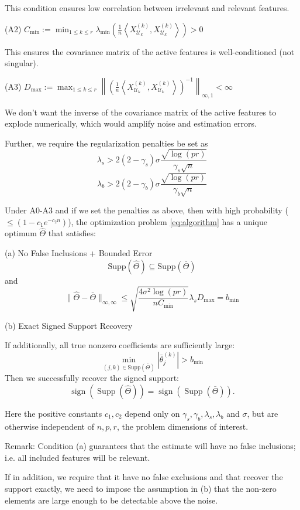 \documentclass{article}
\begin{document}
This condition ensures low correlation between irrelevant and relevant features.

(A2)
$C_{\min} := \min_{1 \le k \le r} \lambda_{\min} \left( \frac{1}{n}\left< X^{(k)}_{\mathcal{U}_k}, X^{(k)}_{\mathcal{U}_k} \right>\right) > 0$

This ensures the covariance matrix of the active features is well-conditioned (not singular).

(A3)
$D_{\max} := \max_{1 \le k \le r}
\left\|\left( \frac{1}{n} \left< X^{(k)}_{\mathcal{U}_k}, X^{(k)}_{\mathcal{U}_k}\right> \right)^{-1} \right\|_{\infty, 1}
< \infty$

We don’t want the inverse of the covariance matrix of the active features to explode numerically, which would amplify noise and estimation errors.

Further, we require the regularization penalties be set as
$$\lambda_s > 2(2 - \gamma_s)\sigma \frac{\sqrt{\log(pr)}}{\gamma_s \sqrt{n}}$$
$$\lambda_b > 2(2 - \gamma_b)\sigma \frac{\sqrt{\log(pr)}}{\gamma_b \sqrt{n}}$$

Under A0-A3 and if we set the penalties as above, then with high probability ($\le (1 - c_1 e^{-c_2 n})$), the optimization problem \eqref{eq:algorithm} has a unique optimum $\widehat{\Theta}$ that satisfies:

(a) No False Inclusions + Bounded Error
$$\text{Supp}(\widehat{\Theta}) \subseteq \text{Supp}(\bar{\Theta})$$
and
\begin{equation*}
\|\widehat{\Theta} - \bar{\Theta}\|_{\infty, \infty}
\le
\sqrt{\frac{4\sigma^2 \log(p r)}{n C_{\min}}}\lambda_s D_{\max} =  b_{\min}
\end{equation*}

(b) Exact Signed Support Recovery

If additionally, all true nonzero coefficients are sufficiently large:
$$\min_{(j,k) \in \text{Supp}(\bar{\Theta})} |\bar{\theta}^{(k)}_j| > b_{\min}$$
Then we successfully recover the signed support:
$$\operatorname{sign}(\operatorname{Supp}(\hat{\Theta})) = \operatorname{sign}(\operatorname{Supp}(\bar{\Theta})).$$

Here the positive constants $c_1, c_2$ depend only on $\gamma_s, \gamma_b, \lambda_s, \lambda_b$ and $\sigma$, but are otherwise independent of $n, p, r$, the problem dimensions of interest.

Remark: Condition (a) guarantees that the estimate will have no false inclusions; i.e. all included features will be relevant.

If in addition, we require that it have no false exclusions and that recover the support exactly, we need to impose the assumption in (b) that the non-zero elements are large enough to be detectable above the noise.
\end{document}
